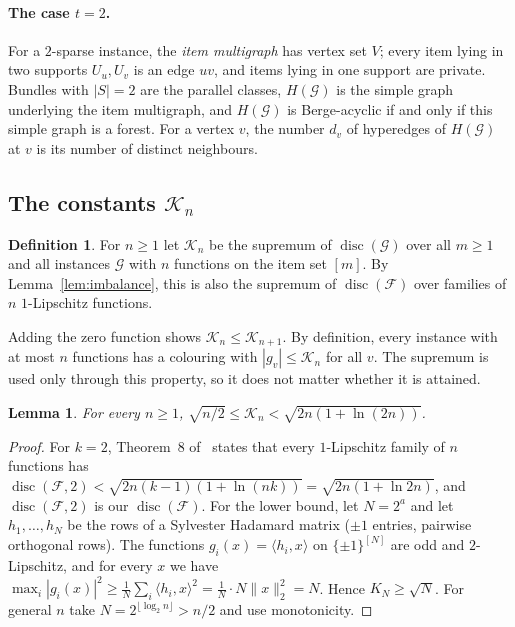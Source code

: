 \documentclass[11pt,letterpaper]{article}
\newtheorem{lemma}[theorem]{Lemma}
\theoremstyle{definition}
\newtheorem{definition}[theorem]{Definition}
\newcommand{\cF}{\mathcal{F}}
\newcommand{\cG}{\mathcal{G}}
\newcommand{\cube}[1]{\{\pm1\}^{#1}}
\DeclareMathOperator{\disc}{disc}
\begin{document}
\paragraph{The case $t=2$.}
For a $2$-sparse instance, the \emph{item multigraph} has vertex set $V$; every item lying in two
supports $U_u,U_v$ is an edge $uv$, and items lying in one support are private. Bundles with
$|S|=2$ are the parallel classes, $H(\cG)$ is the simple graph underlying the item multigraph, and
$H(\cG)$ is Berge-acyclic if and only if this simple graph is a forest. For a vertex $v$, the
number $d_v$ of hyperedges of $H(\cG)$ at $v$ is its number of distinct neighbours.

\subsection{The constants \texorpdfstring{$\mathcal{K}_n$}{K\_n}}

\begin{definition}\label{def:Kn}
For $n\ge1$ let $\mathcal{K}_n$ be the supremum of $\disc(\cG)$ over all $m\ge1$ and all instances $\cG$
with $n$ functions on the item set $[m]$. By Lemma~\ref{lem:imbalance}, this is also the supremum
of $\disc(\cF)$ over families of $n$ $1$-Lipschitz functions.
\end{definition}

Adding the zero function shows $\mathcal{K}_n\le \mathcal{K}_{n+1}$. By definition, every instance with at most $n$
functions has a colouring with $|g_v|\le \mathcal{K}_n$ for all $v$. The supremum is used only through this
property, so it does not matter whether it is attained.

\begin{lemma}\label{lem:Kbounds}
For every $n\ge1$, $\sqrt{n/2}\le \mathcal{K}_n<\sqrt{2n(1+\ln(2n))}$.
\end{lemma}

\begin{proof}
For $k=2$, Theorem~8 of~\cite{HMMS25} states that every $1$-Lipschitz family of $n$ functions has
$\disc(\cF,2)<\sqrt{2n(k-1)(1+\ln(nk))}=\sqrt{2n(1+\ln 2n)}$, and $\disc(\cF,2)$ is our
$\disc(\cF)$. For the lower bound, let $N=2^a$ and let $h_1,\dots,h_N$ be the rows of a Sylvester
Hadamard matrix ($\pm1$ entries, pairwise orthogonal rows). The functions $g_i(x)=\langle
h_i,x\rangle$ on $\cube{[N]}$ are odd and $2$-Lipschitz, and for every $x$ we have
$\max_i|g_i(x)|^2\ge\frac1N\sum_i\langle h_i,x\rangle^2=\frac1N\cdot N\|x\|_2^2=N$. Hence
$K_N\ge\sqrt N$. For general $n$ take $N=2^{\lfloor\log_2n\rfloor}>n/2$ and use monotonicity.
\end{proof}
\end{document}
